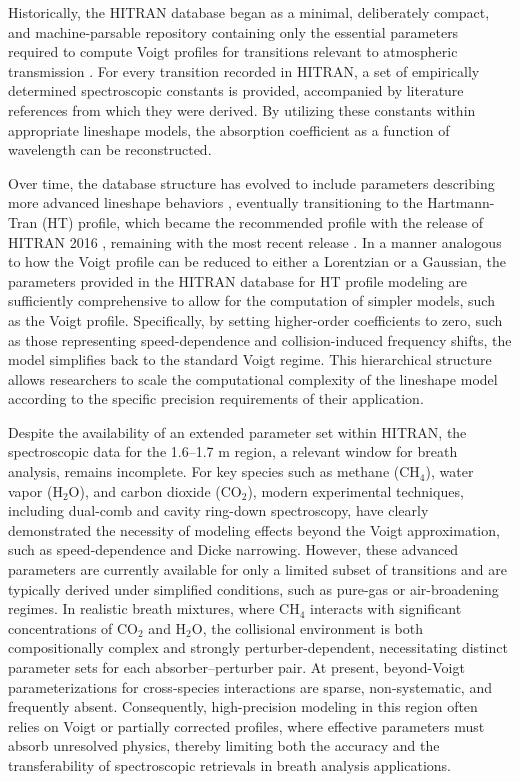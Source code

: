 \documentclass[12pt]{report}
\begin{document}
	Historically, the HITRAN database began as a minimal, deliberately compact, and machine-parsable repository containing only the essential parameters required to compute Voigt profiles for transitions relevant to atmospheric transmission \cite{hitran_original_1973}. For every transition recorded in HITRAN, a set of empirically determined spectroscopic constants is provided, accompanied by literature references from which they were derived. By utilizing these constants within appropriate lineshape models, the absorption coefficient as a function of wavelength can be reconstructed.
	
	Over time, the database structure has evolved to include parameters describing more advanced lineshape behaviors \cite{hitran_1986}, eventually transitioning to the Hartmann-Tran (HT) profile, which became the recommended profile with the release of HITRAN 2016 \cite{hitran_2016}, remaining with the most recent release \cite{hitran_2024}. In a manner analogous to how the Voigt profile can be reduced to either a Lorentzian or a Gaussian, the parameters provided in the HITRAN database for HT profile modeling are sufficiently comprehensive to allow for the computation of simpler models, such as the Voigt profile. Specifically, by setting higher-order coefficients to zero, such as those representing speed-dependence and collision-induced frequency shifts, the model simplifies back to the standard Voigt regime. This hierarchical structure allows researchers to scale the computational complexity of the lineshape model according to the specific precision requirements of their application.
	
	Despite the availability of an extended parameter set within HITRAN, the spectroscopic data for the 1.6–1.7 {\textmu}m region, a relevant window for breath analysis, remains incomplete. For key species such as methane ($\text{CH}_4$), water vapor ($\text{H}_2\text{O}$), and carbon dioxide ($\text{CO}_2$), modern experimental techniques, including dual-comb and cavity ring-down spectroscopy, have clearly demonstrated the necessity of modeling effects beyond the Voigt approximation, such as speed-dependence and Dicke narrowing. However, these advanced parameters are currently available for only a limited subset of transitions and are typically derived under simplified conditions, such as pure-gas or air-broadening regimes. In realistic breath mixtures, where $\text{CH}_4$ interacts with significant concentrations of $\text{CO}_2$ and $\text{H}_2\text{O}$, the collisional environment is both compositionally complex and strongly perturber-dependent, necessitating distinct parameter sets for each absorber–perturber pair. At present, beyond-Voigt parameterizations for cross-species interactions are sparse, non-systematic, and frequently absent. Consequently, high-precision modeling in this region often relies on Voigt or partially corrected profiles, where effective parameters must absorb unresolved physics, thereby limiting both the accuracy and the transferability of spectroscopic retrievals in breath analysis applications.
	
\end{document}
